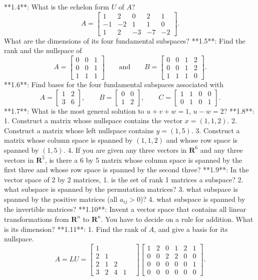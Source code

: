 

**1.4**: What is the echelon form \(U\) of \(A\)? \[A=\begin{bmatrix}1&2&0&2&1\\ -1&-2&1&1&0\\ 1&2&-3&-7&-2\end{bmatrix}.\] What are the dimensions of its four fundamental subspaces? **1.5**: Find the rank and the nullspace of \[A=\begin{bmatrix}0&0&1\\ 0&0&1\\ 1&1&1\end{bmatrix}\qquad\text{and}\qquad B=\begin{bmatrix}0&0&1&2\\ 0&0&1&2\\ 1&1&1&0\end{bmatrix}.\]
**1.6**: Find bases for the four fundamental subspaces associated with \[A=\begin{bmatrix}1&2\\ 3&6\end{bmatrix},\qquad B=\begin{bmatrix}0&0\\ 1&2\end{bmatrix},\qquad C=\begin{bmatrix}1&1&0&0\\ 0&1&0&1\end{bmatrix}.\]
**1.7**: What is the most general solution to \(u+v+w=1\), \(u-w=2\)? **1.8**: 1. Construct a matrix whose nullspace contains the vector \(x=(1,1,2)\). 2. Construct a matrix whose left nullspace contains \(y=(1,5)\). 3. Construct a matrix whose column space is spanned by \((1,1,2)\) and whose row space is spanned by \((1,5)\). 4. If you are given any three vectors in \(\mathbf{R}^{6}\) and any three vectors in \(\mathbf{R}^{5}\), is there a 6 by 5 matrix whose column space is spanned by the first three and whose row space is spanned by the second three? **1.9**: In the vector space of 2 by 2 matrices, 1. is the set of rank 1 matrices a subspace? 2. what subspace is spanned by the permutation matrices? 3. what subspace is spanned by the positive matrices (all \(a_{ij}>0\))? 4. what subspace is spanned by the invertible matrices?
**1.10**: Invent a vector space that contains all linear transformations from \(\mathbf{R}^{n}\) to \(\mathbf{R}^{n}\). You have to decide on a rule for addition. What is its dimension?
**1.11**: 1. Find the rank of \(A\), and give a basis for its nullspace. \[A=LU=\begin{bmatrix}1&&&&\\ 2&1&&\\ 2&1&2&\\ 3&2&4&1\end{bmatrix}\begin{bmatrix}1&2&0&1&2&1\\ 0&0&2&2&0&0\\ 0&0&0&0&0&1\\ 0&0&0&0&0&0\end{bmatrix}.\]